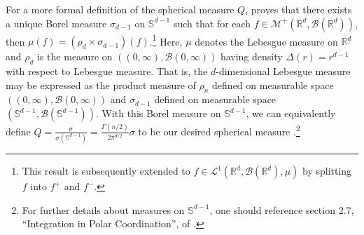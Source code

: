 \documentclass{article}
\begin{document}
For a more formal definition of the spherical measure $Q$, \cite{folland1999real} proves that there exists a unique Borel measure $\sigma_{d-1}$ on $\mathbb{S}^{d-1}$ such that for each $f \in \mathcal{M}^+(\mathbb{R}^d,\mathcal{B}(\mathbb{R}^d))$, then $\mu(f) = (\rho_d \times \sigma_{d-1})(f)$.\footnote{This result is subsequently extended to $f \in \mathcal{L}^1(\mathbb{R}^d, \mathcal{B}(\mathbb{R}^d), \mu)$ by splitting $f$ into $f^+$ and $f^-$.}  Here, $\mu$ denotes the Lebesgue measure on $\mathbb{R}^d$ and $\rho_d$ is the measure on $((0, \infty), \mathcal{B}(0, \infty))$ having density $\Delta(r) = r^{d-1}$ with respect to Lebesgue measure. That is, the $d$-dimensional Lebesgue measure may be expressed as the product measure of $\rho_n$ defined on measurable space $((0, \infty), \mathcal{B}(0, \infty))$ and $\sigma_{d-1}$ defined on measurable space $(\mathbb{S}^{d-1}, \mathcal{B}(\mathbb{S}^{d-1}))$. With this Borel measure on $\mathbb{S}^{d-1}$, we can equivalently define  $Q = \frac{\sigma}{\sigma(\mathbb{S}^{d-1})} = \frac{\Gamma(n/2)}{2 \pi^{d/2}} \sigma$ to be our desired spherical measure \cite{folland1999real}.\footnote{For further details about measures on $\mathbb{S}^{d-1}$, one should reference section 2.7, \enquote{Integration in Polar Coordination}, of \cite{folland1999real}.}
\end{document}

